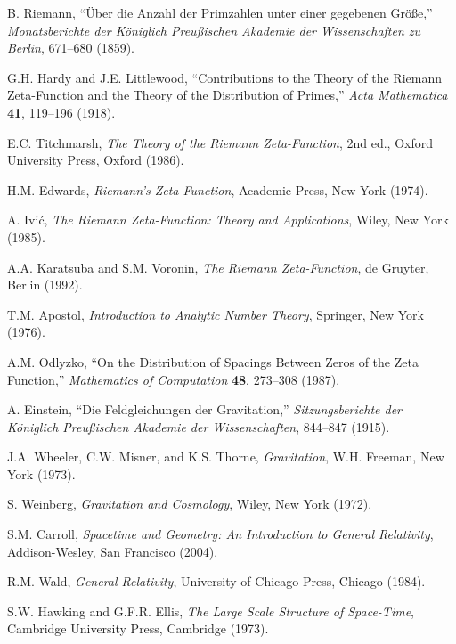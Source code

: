 \documentclass[12pt,a4paper]{article}
\begin{document}
\begin{thebibliography}{99}

 B. Riemann, ``Über die Anzahl der Primzahlen unter einer gegebenen Größe,'' \emph{Monatsberichte der Königlich Preußischen Akademie der Wissenschaften zu Berlin}, 671--680 (1859).

 G.H. Hardy and J.E. Littlewood, ``Contributions to the Theory of the Riemann Zeta-Function and the Theory of the Distribution of Primes,'' \emph{Acta Mathematica} \textbf{41}, 119--196 (1918).

 E.C. Titchmarsh, \emph{The Theory of the Riemann Zeta-Function}, 2nd ed., Oxford University Press, Oxford (1986).

 H.M. Edwards, \emph{Riemann's Zeta Function}, Academic Press, New York (1974).

 A. Ivić, \emph{The Riemann Zeta-Function: Theory and Applications}, Wiley, New York (1985).

 A.A. Karatsuba and S.M. Voronin, \emph{The Riemann Zeta-Function}, de Gruyter, Berlin (1992).

 T.M. Apostol, \emph{Introduction to Analytic Number Theory}, Springer, New York (1976).

 A.M. Odlyzko, ``On the Distribution of Spacings Between Zeros of the Zeta Function,'' \emph{Mathematics of Computation} \textbf{48}, 273--308 (1987).

 A. Einstein, ``Die Feldgleichungen der Gravitation,'' \emph{Sitzungsberichte der Königlich Preußischen Akademie der Wissenschaften}, 844--847 (1915).

 J.A. Wheeler, C.W. Misner, and K.S. Thorne, \emph{Gravitation}, W.H. Freeman, New York (1973).

 S. Weinberg, \emph{Gravitation and Cosmology}, Wiley, New York (1972).

 S.M. Carroll, \emph{Spacetime and Geometry: An Introduction to General Relativity}, Addison-Wesley, San Francisco (2004).

 R.M. Wald, \emph{General Relativity}, University of Chicago Press, Chicago (1984).

 S.W. Hawking and G.F.R. Ellis, \emph{The Large Scale Structure of Space-Time}, Cambridge University Press, Cambridge (1973).


\end{thebibliography}
\end{document}
